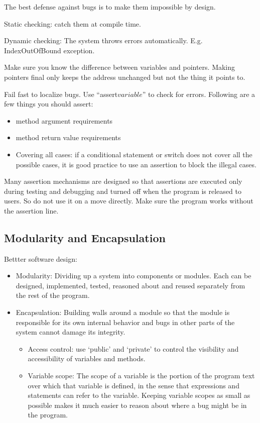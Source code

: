 \documentclass[letterpaper,12pt]{article}
\begin{document}
The best defense against bugs is to make them impossible by design.

Static checking: catch them at compile time.

Dynamic checking: The system throws errors automatically. E.g. IndexOutOfBound
exception.

Make sure you know the difference between variables and pointers. Making
pointers final only keeps the address unchanged but not the thing it points to.

Fail fast to localize bugs. Use ``assert\(variable\)'' to check for errors.
Following are a few things you should assert:
\begin{itemize}
      \item method argument requirements
      \item method return value requirements
      \item Covering all cases: if a conditional statement or switch does not cover all the
            possible cases, it is good practice to use an assertion to block the illegal
            cases.
\end{itemize}

Many assertion mechanisms are designed so that assertions are executed only
during testing and debugging and turned off when the program is released to
users. So do not use it on a move directly. Make sure the program works without
the assertion line.

\subsection{Modularity and Encapsulation}
Bettter software design:
\begin{itemize}
      \item Modularity: Dividing up a system into components or modules. Each can be
            designed, implemented, tested, reasoned about and reused separately from the
            rest of the program.
      \item Encapsulation: Building walls around a module so that the module is responsible for
            its own internal behavior and bugs in other parts of the system cannot damage
            its integrity.
            \begin{itemize}
                  \item Access control: use `public' and `private' to control the visibility and
                        accessibility of variables and methods.
                  \item Variable scope: The scope of a variable is the portion of the program text over
                        which that variable is defined, in the sense that expressions and statements
                        can refer to the variable. Keeping variable scopes as small as possible makes
                        it much easier to reason about where a bug might be in the program.
            \end{itemize}
\end{itemize}
\end{document}
